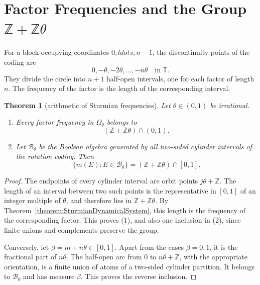 \documentclass{book}
\newtheorem{theorem}[definition]{Theorem}
\begin{document}
\section{Factor Frequencies and the Group
  \texorpdfstring{\(\mathbb Z+\mathbb Z\theta\)}{Z+Z theta}}

For a block occupying coordinates \(0,ldots,n-1\), the discontinuity
points of the coding are
\[
  0,-\theta,-2\theta,\ldots,-n\theta
  \quad\text{in }\mathbb T.
\]
They divide the circle into \(n+1\) half-open intervals, one for each factor
of length \(n\).  The frequency of the factor is the length of the
corresponding interval.

\begin{theorem}[arithmetic of Sturmian frequencies]
  \label{theorem:SturmianFrequencyGroup}
  Let \(\theta\in(0,1)\) be irrational.
  \begin{enumerate}
    \item Every factor frequency in \(\Omega_\theta\) belongs to
      \[
        (\mathbb Z+\mathbb Z\theta)\cap(0,1).
      \]
    \item Let \(\mathcal B_\theta\) be the Boolean algebra generated by all
      two-sided cylinder intervals of the rotation coding.  Then
      \[
        \{m(E):E\in\mathcal B_\theta\}
        = (\mathbb Z+\mathbb Z\theta)\cap[0,1].
      \]
  \end{enumerate}
\end{theorem}
\begin{proof}
  The endpoints of every cylinder interval are orbit points
  \(j\theta+\mathbb Z\).  The length of an interval between two such points
  is the representative in \([0,1]\) of an integer multiple of \(\theta\),
  and therefore lies in \(\mathbb Z+\mathbb Z\theta\).  By
  Theorem~\ref{theorem:SturmianDynamicalSystem}, this length is the
  frequency of the corresponding factor.  This proves (1), and also one
  inclusion in (2), since finite unions and complements preserve the group.

  Conversely, let \(\beta=m+n\theta\in[0,1]\).  Apart from the cases
  \(\beta=0,1\), it is the fractional part of \(n\theta\).  The half-open
  arc from \(0\) to \(n\theta+\mathbb Z\), with the appropriate orientation,
  is a finite union of atoms of a two-sided cylinder partition.  It belongs
  to \(\mathcal B_\theta\) and has measure \(\beta\).  This proves the
  reverse inclusion.
\end{proof}
\end{document}

